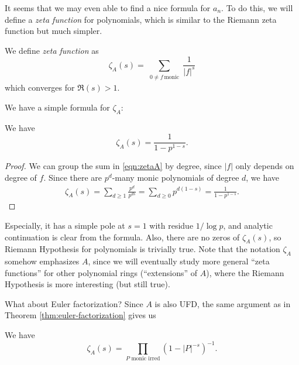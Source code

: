 It seems that we may even able to find a nice formula for $a_n$.
To do this, we will define a \emph{zeta function} for polynomials, which is similar to the Riemann zeta function but much simpler.
\begin{definition}
    We define \emph{zeta function} as
    \begin{equation}
        \zeta_A(s) = \sum_{\substack{0 \ne f\,\text{monic}}} \frac{1}{|f|^s}
        \label{eqn:zetaA}
    \end{equation}
    which converges for $\Re(s) > 1$.
\end{definition}

We have a simple formula for $\zeta_A$:
\begin{proposition}
    \label{prop:zetaA}
    We have
    \begin{equation}
        \zeta_A(s) = \frac{1}{1 - p^{1 - s}}.
        \label{eqn:zetaA_formula}
    \end{equation}
\end{proposition}
\begin{proof}
    We can group the sum in \eqref{eqn:zetaA} by degree, since $|f|$ only depends on degree of $f$.
    Since there are $p^d$-many monic polynomials of degree $d$, we have
    \begin{align*}
        \zeta_A(s) = \sum_{d \ge 1} \frac{p^d}{p^{ds}} = \sum_{d \ge 0} p^{d(1 - s)} = \frac{1}{1 - p^{1 - s}}.
    \end{align*}
\end{proof}
Especially, it has a simple pole at $s = 1$ with residue $1 / \log p$, and analytic continuation is clear from the formula.
Also, there are no zeros of $\zeta_A(s)$, so Riemann Hypothesis for polynomials is trivially true.
Note that the notation $\zeta_A$ somehow emphasizes $A$, since we will eventually study more general ``zeta functions'' for other polynomial rings (``extensions'' of $A$), where the Riemann Hypothesis is more interesting (but still true).

What about Euler factorization?
Since $A$ is also UFD, the same argument as in Theorem \ref{thm:euler-factorization} gives us
\begin{theorem}
    \label{thm:euler-factorization-poly}
    We have
    \begin{equation}
        \zeta_A(s) = \prod_{P\text{ monic irred}} (1 - |P|^{-s})^{-1}.
        \label{eqn:euler-factorization-poly}
    \end{equation}
\end{theorem}

